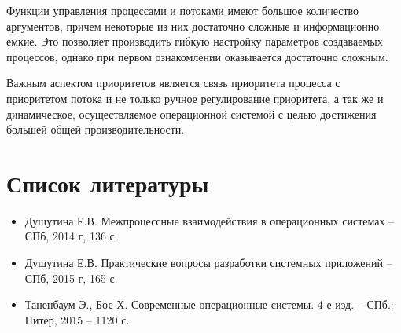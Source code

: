 \documentclass[a4paper]{article}
\begin{document}
	Функции управления процессами и потоками имеют большое количество аргументов, причем некоторые из них достаточно сложные и информационно емкие. Это позволяет производить гибкую настройку параметров создаваемых процессов, однако при первом ознакомлении оказывается достаточно сложным.
	
	
	Важным аспектом приоритетов является связь приоритета процесса с приоритетом потока и не только ручное регулирование приоритета, а так же и динамическое, осуществляемое операционной системой с целью достижения большей общей производительности.

\section{Список литературы}
\begin{itemize}
\item Душутина Е.В.  Межпроцессные взаимодействия в операционных системах – СПб, 2014 г, 136 с.
\item Душутина Е.В.  Практические вопросы разработки системных приложений – СПб, 2015 г, 165 с.
\item Таненбаум Э., Бос Х. Современные операционные системы. 4-е изд. – СПб.: Питер, 2015 – 1120 с.
\end{itemize}
\end{document}
